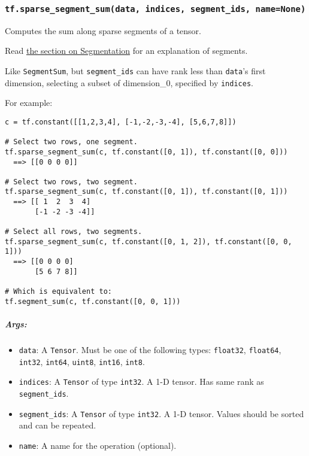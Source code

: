 \subsubsection{\texorpdfstring{\texttt{tf.sparse\_segment\_sum(data,\ indices,\ segment\_ids,\ name=None)}
}{tf.sparse\_segment\_sum(data, indices, segment\_ids, name=None) }}\label{tf.sparseux5fsegmentux5fsumdata-indices-segmentux5fids-namenone}

Computes the sum along sparse segments of a tensor.

Read \href{../../api_docs/python/math_ops.md\#segmentation}{the section
on Segmentation} for an explanation of segments.

Like \texttt{SegmentSum}, but \texttt{segment\_ids} can have rank less
than \texttt{data}'s first dimension, selecting a subset of
dimension\_0, specified by \texttt{indices}.

For example:

\begin{verbatim}
c = tf.constant([[1,2,3,4], [-1,-2,-3,-4], [5,6,7,8]])

# Select two rows, one segment.
tf.sparse_segment_sum(c, tf.constant([0, 1]), tf.constant([0, 0]))
  ==> [[0 0 0 0]]

# Select two rows, two segment.
tf.sparse_segment_sum(c, tf.constant([0, 1]), tf.constant([0, 1]))
  ==> [[ 1  2  3  4]
       [-1 -2 -3 -4]]

# Select all rows, two segments.
tf.sparse_segment_sum(c, tf.constant([0, 1, 2]), tf.constant([0, 0, 1]))
  ==> [[0 0 0 0]
       [5 6 7 8]]

# Which is equivalent to:
tf.segment_sum(c, tf.constant([0, 0, 1]))
\end{verbatim}

\subparagraph{Args: }\label{args-52}

\begin{itemize}
\tightlist
\item
  \texttt{data}: A \texttt{Tensor}. Must be one of the following types:
  \texttt{float32}, \texttt{float64}, \texttt{int32}, \texttt{int64},
  \texttt{uint8}, \texttt{int16}, \texttt{int8}.
\item
  \texttt{indices}: A \texttt{Tensor} of type \texttt{int32}. A 1-D
  tensor. Has same rank as \texttt{segment\_ids}.
\item
  \texttt{segment\_ids}: A \texttt{Tensor} of type \texttt{int32}. A 1-D
  tensor. Values should be sorted and can be repeated.
\item
  \texttt{name}: A name for the operation (optional).
\end{itemize}


